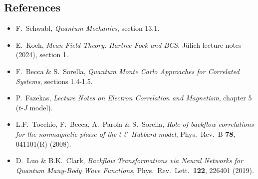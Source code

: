 \documentclass[../../main.tex]{subfiles}
\begin{document}
\subsection{References}
\begin{itemize}
\item F.\ Schwabl, \emph{Quantum Mechanics}, section 13.1.
\item E.\ Koch, \emph{Mean-Field Theory: Hartree-Fock and BCS}, J\"ulich lecture
      notes (2024), section 1.
\item F.\ Becca \& S.\ Sorella, \emph{Quantum Monte Carlo Approaches for
      Correlated Systems}, sections 1.4-1.5.
\item P.\ Fazekas, \emph{Lecture Notes on Electron Correlation and Magnetism},
      chapter 5 ($t$-$J$ model).
\item L.F.\ Tocchio, F.\ Becca, A.\ Parola \& S.\ Sorella, \emph{Role of backflow
      correlations for the nonmagnetic phase of the $t$-$t'$ Hubbard model},
      Phys.\ Rev.\ B \textbf{78}, 041101(R) (2008).
\item D.\ Luo \& B.K.\ Clark, \emph{Backflow Transformations via Neural Networks
      for Quantum Many-Body Wave Functions}, Phys.\ Rev.\ Lett.\ \textbf{122},
      226401 (2019).
\end{itemize}
\end{document}
